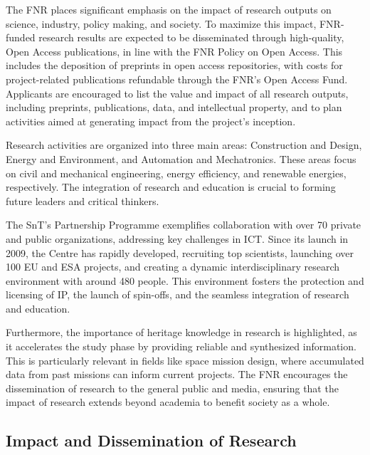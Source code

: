 \documentclass[12pt]{article}
\begin{document}
The FNR places significant emphasis on the impact of research outputs on science, industry, policy making, and society. To maximize this impact, FNR-funded research results are expected to be disseminated through high-quality, Open Access publications, in line with the FNR Policy on Open Access. This includes the deposition of preprints in open access repositories, with costs for project-related publications refundable through the FNR’s Open Access Fund. Applicants are encouraged to list the value and impact of all research outputs, including preprints, publications, data, and intellectual property, and to plan activities aimed at generating impact from the project's inception.

Research activities are organized into three main areas: Construction and Design, Energy and Environment, and Automation and Mechatronics. These areas focus on civil and mechanical engineering, energy efficiency, and renewable energies, respectively. The integration of research and education is crucial to forming future leaders and critical thinkers.

The SnT’s Partnership Programme exemplifies collaboration with over 70 private and public organizations, addressing key challenges in ICT. Since its launch in 2009, the Centre has rapidly developed, recruiting top scientists, launching over 100 EU and ESA projects, and creating a dynamic interdisciplinary research environment with around 480 people. This environment fosters the protection and licensing of IP, the launch of spin-offs, and the seamless integration of research and education.

Furthermore, the importance of heritage knowledge in research is highlighted, as it accelerates the study phase by providing reliable and synthesized information. This is particularly relevant in fields like space mission design, where accumulated data from past missions can inform current projects. The FNR encourages the dissemination of research to the general public and media, ensuring that the impact of research extends beyond academia to benefit society as a whole.

\subsection{Impact and Dissemination of Research}
\end{document}
